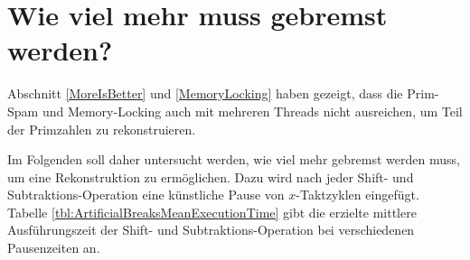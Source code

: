 



















\section{Wie viel mehr muss gebremst werden?}
\label{Howfast}

Abschnitt \ref{MoreIsBetter} und \ref{MemoryLocking} haben gezeigt, dass die Prim-Spam und Memory-Locking auch mit mehreren Threads nicht ausreichen, um Teil der Primzahlen zu rekonstruieren.

Im Folgenden soll daher untersucht werden, wie viel mehr gebremst werden muss, um eine Rekonstruktion zu ermöglichen.
Dazu wird nach jeder Shift- und Subtraktions-Operation eine künstliche Pause von $x$-Taktzyklen eingefügt.
Tabelle \ref{tbl:ArtificialBreaksMeanExecutionTime} gibt die erzielte mittlere Ausführungszeit der Shift- und Subtraktions-Operation bei verschiedenen Pausenzeiten an.


